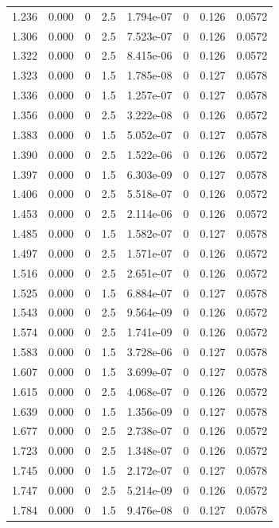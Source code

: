 \documentclass[preview]{standalone}
\begin{document}
{{{\begin{tabular}{L{1.2cm}C{1.2cm} C{0.3cm}C{0.5cm} C{1.4cm}C{1.4cm} C{1.4cm}C{1.4cm}}
  1.236  &  0.000  & 0     & 2.5 &  1.794e-07  & 0  & 0.126 &  0.0572   \\ 
  1.306  &  0.000  & 0     & 2.5 &  7.523e-07  & 0  & 0.126 &  0.0572   \\ 
  1.322  &  0.000  & 0     & 2.5 &  8.415e-06  & 0  & 0.126 &  0.0572   \\ 
  1.323  &  0.000  & 0     & 1.5 &  1.785e-08  & 0  & 0.127 &  0.0578   \\ 
  1.336  &  0.000  & 0     & 1.5 &  1.257e-07  & 0  & 0.127 &  0.0578   \\ 
  1.356  &  0.000  & 0     & 2.5 &  3.222e-08  & 0  & 0.126 &  0.0572   \\ 
  1.383  &  0.000  & 0     & 1.5 &  5.052e-07  & 0  & 0.127 &  0.0578   \\ 
  1.390  &  0.000  & 0     & 2.5 &  1.522e-06  & 0  & 0.126 &  0.0572   \\ 
  1.397  &  0.000  & 0     & 1.5 &  6.303e-09  & 0  & 0.127 &  0.0578   \\ 
  1.406  &  0.000  & 0     & 2.5 &  5.518e-07  & 0  & 0.126 &  0.0572   \\ 
  1.453  &  0.000  & 0     & 2.5 &  2.114e-06  & 0  & 0.126 &  0.0572   \\ 
  1.485  &  0.000  & 0     & 1.5 &  1.582e-07  & 0  & 0.127 &  0.0578   \\ 
  1.497  &  0.000  & 0     & 2.5 &  1.571e-07  & 0  & 0.126 &  0.0572   \\ 
  1.516  &  0.000  & 0     & 2.5 &  2.651e-07  & 0  & 0.126 &  0.0572   \\ 
  1.525  &  0.000  & 0     & 1.5 &  6.884e-07  & 0  & 0.127 &  0.0578   \\ 
  1.543  &  0.000  & 0     & 2.5 &  9.564e-09  & 0  & 0.126 &  0.0572   \\ 
  1.574  &  0.000  & 0     & 2.5 &  1.741e-09  & 0  & 0.126 &  0.0572   \\ 
  1.583  &  0.000  & 0     & 1.5 &  3.728e-06  & 0  & 0.127 &  0.0578   \\ 
  1.607  &  0.000  & 0     & 1.5 &  3.699e-07  & 0  & 0.127 &  0.0578   \\ 
  1.615  &  0.000  & 0     & 2.5 &  4.068e-07  & 0  & 0.126 &  0.0572   \\ 
  1.639  &  0.000  & 0     & 1.5 &  1.356e-09  & 0  & 0.127 &  0.0578   \\ 
  1.677  &  0.000  & 0     & 2.5 &  2.738e-07  & 0  & 0.126 &  0.0572   \\ 
  1.723  &  0.000  & 0     & 2.5 &  1.348e-07  & 0  & 0.126 &  0.0572   \\ 
  1.745  &  0.000  & 0     & 1.5 &  2.172e-07  & 0  & 0.127 &  0.0578   \\ 
  1.747  &  0.000  & 0     & 2.5 &  5.214e-09  & 0  & 0.126 &  0.0572   \\ 
  1.784  &  0.000  & 0     & 1.5 &  9.476e-08  & 0  & 0.127 &  0.0578   \\ 
\hline 
\end{tabular} 

}}}
\end{document}
